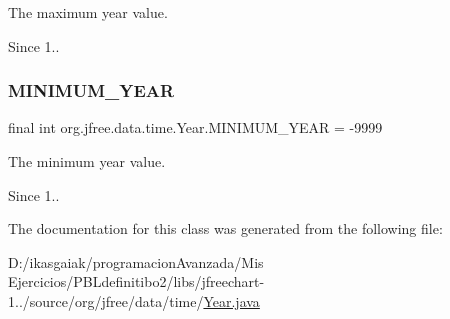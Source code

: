 The maximum year value.

\begin{DoxySince}{Since}
1.. 
\end{DoxySince}
\mbox{\label{classorg_1_1jfree_1_1data_1_1time_1_1_year_a27210f049573ad8dcf5049cce284ecb2}} 
\subsubsection{\texorpdfstring{M\+I\+N\+I\+M\+U\+M\+\_\+\+Y\+E\+AR}{MINIMUM\_YEAR}}
{\footnotesize\ttfamily final int org.\+jfree.\+data.\+time.\+Year.\+M\+I\+N\+I\+M\+U\+M\+\_\+\+Y\+E\+AR = -\/9999\hspace{0.3cm}{\ttfamily [static]}}

The minimum year value.

\begin{DoxySince}{Since}
1.. 
\end{DoxySince}


The documentation for this class was generated from the following file\+:\begin{DoxyCompactItemize}
\item 
D\+:/ikasgaiak/programacion\+Avanzada/\+Mis Ejercicios/\+P\+B\+Ldefinitibo2/libs/jfreechart-\/1../source/org/jfree/data/time/\mbox{\hyperlink{_year_8java}{Year.\+java}}\end{DoxyCompactItemize}
